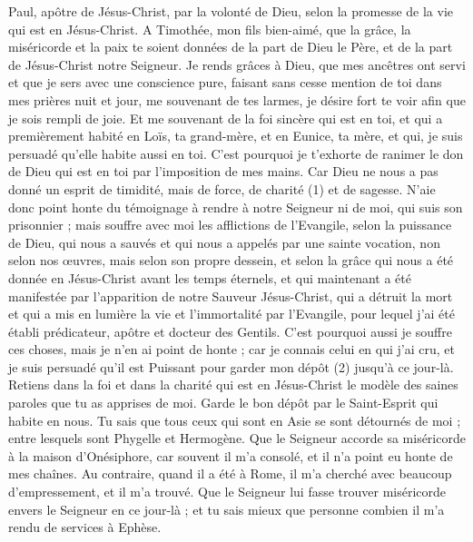 \BFont
\begin{multicols}{2}
\VerseOne{}Paul, apôtre de Jésus-Christ, par la volonté de Dieu, selon la promesse de la vie qui est en Jésus-Christ.
A Timothée, mon fils bien-aimé, que la grâce, la miséricorde et la paix te soient données de la part de Dieu le Père, et de la part de Jésus-Christ notre Seigneur.
Je rends grâces à Dieu, que mes ancêtres ont servi et que je sers avec une conscience pure, faisant sans cesse mention de toi dans mes prières nuit et jour,
me souvenant de tes larmes, je désire fort te voir afin que je sois rempli de joie.
Et me souvenant de la foi sincère qui est en toi, et qui a premièrement habité en Loïs, ta grand-mère, et en Eunice, ta mère, et qui, je suis persuadé qu'elle habite aussi en toi.
C'est pourquoi je t'exhorte de ranimer le don de Dieu qui est en toi par l'imposition de mes mains.
Car Dieu ne nous a pas donné un esprit de timidité, mais de force, de charité (1) et de sagesse.
N’aie donc point honte du témoignage à rendre à notre Seigneur ni de moi, qui suis son prisonnier ; mais souffre avec moi les afflictions de l'Evangile, selon la puissance de Dieu,
qui nous a sauvés et qui nous a appelés par une sainte vocation, non selon nos œuvres, mais selon son propre dessein, et selon la grâce qui nous a été donnée en Jésus-Christ avant les temps éternels,
et qui maintenant a été manifestée par l'apparition de notre Sauveur Jésus-Christ, qui a détruit la mort et qui a mis en lumière la vie et l'immortalité par l'Evangile,
pour lequel j'ai été établi prédicateur, apôtre et docteur des Gentils.
C'est pourquoi aussi je souffre ces choses, mais je n'en ai point de honte ; car je connais celui en qui j'ai cru, et je suis persuadé qu'il est Puissant pour garder mon dépôt (2) jusqu'à ce jour-là.
Retiens dans la foi et dans la charité qui est en Jésus-Christ le modèle des saines paroles que tu as apprises de moi.
Garde le bon dépôt par le Saint-Esprit qui habite en nous.
Tu sais que tous ceux qui sont en Asie se sont détournés de moi ; entre lesquels sont Phygelle et Hermogène.
Que le Seigneur accorde sa miséricorde à la maison d'Onésiphore, car souvent il m'a consolé, et il n'a point eu honte de mes chaînes.
Au contraire, quand il a été à Rome, il m'a cherché avec beaucoup d’empressement, et il m'a trouvé.
Que le Seigneur lui fasse trouver miséricorde envers le Seigneur en ce jour-là ; et tu sais mieux que personne combien il m'a rendu de services à Ephèse.

\end{multicols}

